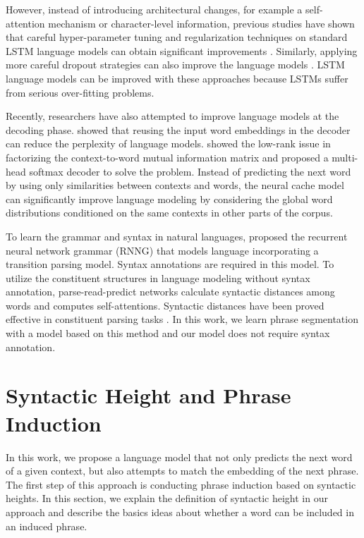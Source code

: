 \documentclass[11pt,a4paper]{article}
\begin{document}
However, instead of introducing architectural changes, for example a self-attention mechanism or character-level information, previous studies have shown that careful hyper-parameter tuning and regularization techniques on standard LSTM language models can obtain significant improvements \cite{melis2017state,merity2017regularizing}. Similarly, applying more careful dropout strategies can also improve the language models \cite{gal2016theoretically,melis2018pushing}. LSTM language models can be improved with these approaches because LSTMs suffer from serious over-fitting problems.

Recently, researchers have also attempted to improve language models at the decoding phase. \citet{inan2016tying} showed that reusing the input word embeddings in the decoder can reduce the perplexity of language models. \citet{yang2017breaking} showed the low-rank issue in factorizing the context-to-word mutual information matrix and proposed a multi-head softmax decoder to solve the problem. Instead of predicting the next word by using only similarities between contexts and words, the neural cache model \cite{grave2016improving} can significantly improve language modeling by considering the global word distributions conditioned on the same contexts in other parts of the corpus.

To learn the grammar and syntax in natural languages, \citet{dyer2016recurrent} proposed the recurrent neural network grammar (RNNG) that models language incorporating a transition parsing model. Syntax annotations are required in this model. To utilize the constituent structures in language modeling without syntax annotation, parse-read-predict networks  \citep[PRPNs;][]{shen2017neural} calculate syntactic distances among words and computes self-attentions. Syntactic distances have been proved effective in constituent parsing tasks \cite{shen2018straight}. In this work, we learn phrase segmentation with a model based on this method and our model does not require syntax annotation.







\section{Syntactic Height and Phrase Induction}
\label{sec:psc}
In this work, we propose a language model that not only predicts the next word of a given context, but also attempts to match the embedding of the next phrase. The first step of this approach is conducting phrase induction based on syntactic heights. In this section, we explain the definition of syntactic height in our approach and describe the basics ideas about whether a word can be included in an induced phrase.
\end{document}
